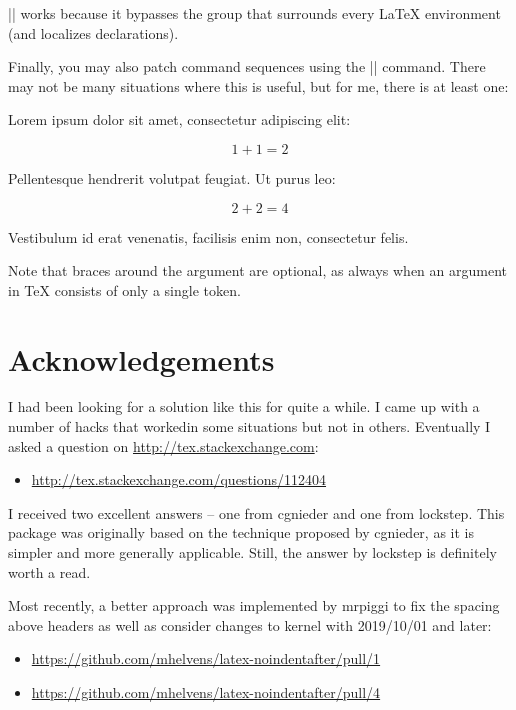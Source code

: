 \documentclass[a4paper]{noindentafter-packagedoc}
\begin{document}
|\NoIndentAfterEnv| works because it bypasses the group
that surrounds every \LaTeX{} environment (and localizes
declarations). 




Finally, you may also patch command sequences using the
|\NoIndentAfterCmd| command. There may not be many situations
where this is useful, but for me, there is at least one:

\begin{latex-example-show}
  Lorem ipsum dolor sit amet, consectetur adipiscing elit:
  
  \[ 1 + 1 = 2 \]
  
  Pellentesque hendrerit volutpat feugiat. Ut purus leo:
  
  \NoIndentAfterCmd \]
  
  \[ 2 + 2 = 4 \]
  
  Vestibulum id erat venenatis, facilisis enim non,
  consectetur felis.
\end{latex-example-show}

Note that braces around the  argument are
optional, as always when an argument in \TeX{} consists
of only a single token.



\section{Acknowledgements}                                                     %

I had been looking for a solution like this for quite a while. I came up
with a number of hacks that workedin some situations but not in others.
Eventually I asked a question on \url{http://tex.stackexchange.com}:
\begin{itemize}
  \item \url{http://tex.stackexchange.com/questions/112404}
\end{itemize}

I received two excellent answers -- one from cgnieder and one from lockstep.
This package was originally based on the technique proposed by cgnieder, as
it is simpler and more generally applicable. Still, the answer by lockstep
is definitely worth a read.

Most recently, a better approach was implemented by mrpiggi to fix the spacing
above headers as well as consider changes to kernel with 2019/10/01 and later:
\begin{itemize}
  \item \url{https://github.com/mhelvens/latex-noindentafter/pull/1}
  \item \url{https://github.com/mhelvens/latex-noindentafter/pull/4}
\end{itemize}

\end{document}
